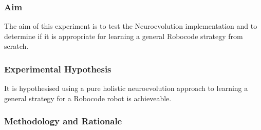 \subsubsection{Aim}
The aim of this experiment is to test the Neuroevolution implementation and to determine if it is appropriate for learning a general Robocode strategy from scratch.

\subsubsection{Experimental Hypothesis}
It is hypothesised using a pure holistic neuroevolution approach to learning a general strategy for a Robocode robot is achieveable.

\subsubsection{Methodology and Rationale}

